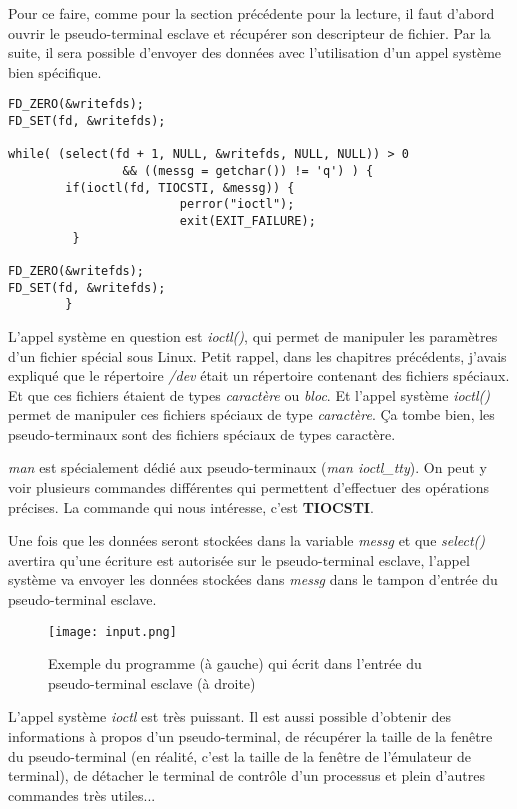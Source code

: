 Pour ce faire, comme pour la section précédente pour la lecture, il faut d'abord ouvrir le pseudo-terminal esclave et récupérer son descripteur de fichier. Par la suite, il sera possible d'envoyer des données avec l'utilisation d'un appel système bien spécifique.

\begin{verbatim}
FD_ZERO(&writefds);
FD_SET(fd, &writefds);

while( (select(fd + 1, NULL, &writefds, NULL, NULL)) > 0 
                && ((messg = getchar()) != 'q') ) {
        if(ioctl(fd, TIOCSTI, &messg)) {
                        perror("ioctl");
                        exit(EXIT_FAILURE);
         }

FD_ZERO(&writefds);
FD_SET(fd, &writefds);
        }
\end{verbatim}

L'appel système en question est \textit{ioctl()}, qui permet de manipuler les paramètres d'un fichier spécial sous Linux. Petit rappel, dans les chapitres précédents, j'avais expliqué que le répertoire \textit{/dev} était un répertoire contenant des fichiers spéciaux. Et que ces fichiers étaient de types \textit{caractère} ou \textit{bloc}. Et l'appel système \textit{ioctl()} permet de manipuler ces fichiers spéciaux de type \textit{caractère}. Ça tombe bien, les pseudo-terminaux sont des fichiers spéciaux de types caractère.

\textit{man} est spécialement dédié aux pseudo-terminaux (\textit{man ioctl\_tty}). On peut y voir plusieurs commandes différentes qui permettent d'effectuer des opérations précises. La commande qui nous intéresse, c'est \textbf{TIOCSTI}.

\newpage

Une fois que les données seront stockées dans la variable \textit{messg} et que \textit{select()} avertira qu'une écriture est autorisée sur le pseudo-terminal esclave, l'appel système va envoyer les données stockées dans \textit{messg} dans le tampon d'entrée du pseudo-terminal esclave.

\begin{figure}[h]
        \centering
        \texttt{[image: input.png]}
        \caption{Exemple du programme (à gauche) qui écrit dans l'entrée du pseudo-terminal esclave (à droite)}
\end{figure}

\begin{tcolorbox}[title=Pour information]
	L'appel système \textit{ioctl} est très puissant. Il est aussi possible d'obtenir des informations à propos d'un pseudo-terminal, de récupérer la taille de la fenêtre du pseudo-terminal (en réalité, c'est la taille de la fenêtre de l'émulateur de terminal), de détacher le terminal de contrôle d'un processus et plein d'autres commandes très utiles...
\end{tcolorbox}

